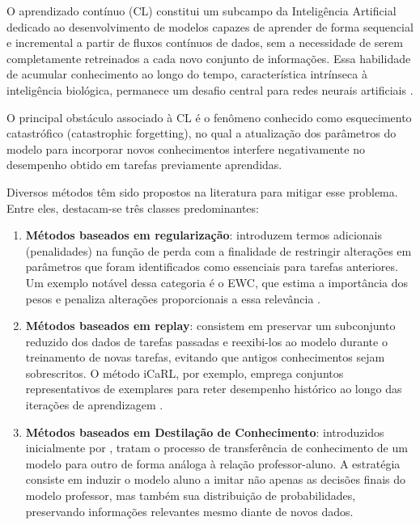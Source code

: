 O aprendizado contínuo (\ac{CL}) constitui um subcampo da Inteligência Artificial dedicado ao desenvolvimento de modelos capazes de aprender de forma sequencial e incremental a partir de fluxos contínuos de dados, sem a necessidade de serem completamente retreinados a cada novo conjunto de informações. Essa habilidade de acumular conhecimento ao longo do tempo, característica intrínseca à inteligência biológica, permanece um desafio central para redes neurais artificiais \cite{delange2021continual}.

O principal obstáculo associado à \ac{CL} é o fenômeno conhecido como esquecimento catastrófico (catastrophic forgetting), no qual a atualização dos parâmetros do modelo para incorporar novos conhecimentos interfere negativamente no desempenho obtido em tarefas previamente aprendidas.

Diversos métodos têm sido propostos na literatura para mitigar esse problema. Entre eles, destacam-se três classes predominantes:

\begin{enumerate}

\item \textbf{Métodos baseados em regularização}: introduzem termos adicionais (penalidades) na função de perda com a finalidade de restringir alterações em parâmetros que foram identificados como essenciais para tarefas anteriores. Um exemplo notável dessa categoria é o \ac{EWC}, que estima a importância dos pesos e penaliza alterações proporcionais a essa relevância \cite{kirkpatrick2017overcoming}.

\item \textbf{Métodos baseados em replay}: consistem em preservar um subconjunto reduzido dos dados de tarefas passadas e reexibi-los ao modelo durante o treinamento de novas tarefas, evitando que antigos conhecimentos sejam sobrescritos. O método iCaRL, por exemplo, emprega conjuntos representativos de exemplares para reter desempenho histórico ao longo das iterações de aprendizagem \cite{rebuffi2017icarl}.

\item \textbf{Métodos baseados em Destilação de Conhecimento}: introduzidos inicialmente por \cite{hinton2015distilling}, tratam o processo de transferência de conhecimento de um modelo para outro de forma análoga à relação professor-aluno. A estratégia consiste em induzir o modelo aluno a imitar não apenas as decisões finais do modelo professor, mas também sua distribuição de probabilidades, preservando informações relevantes mesmo diante de novos dados.
\end{enumerate}

